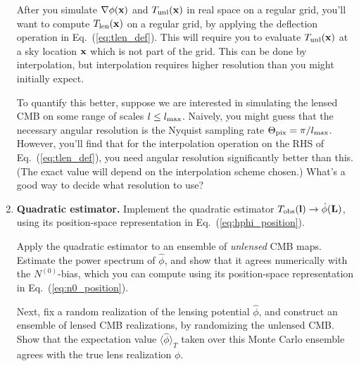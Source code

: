 \documentclass[aps,prd,superscriptaddress,groupedaddress,nofootinbib,nobibnotes]{revtex4}
\def\x{{\bf x}}
\def\l{{\bf l}}
\def\L{{\bf L}}
\def\hphi{{\hat\phi}}
\begin{document}
\begin{enumerate}
  After you simulate $\nabla\phi(\x)$ and $T_{\rm unl}(\x)$ in real space on a regular grid,
  you'll want to compute $T_{\rm len}(\x)$ on a regular grid, by applying the deflection
  operation in Eq.~(\ref{eq:tlen_def}).  This will require you to evaluate $T_{\rm unl}(\x)$
  at a sky location $\x$ which is not part of the grid.  This can be done by interpolation,
  but interpolation requires higher resolution than you might initially expect.

  To quantify this better, suppose we are interested in simulating the lensed CMB on some
  range of scales $l \le l_{\rm max}$.  Naively, you might guess that the necessary angular
  resolution is the Nyquist sampling rate $\Theta_{\rm pix} = \pi/l_{\rm max}$.  However,
  you'll find that for the interpolation operation on the RHS of Eq.~(\ref{eq:tlen_def}),
  you need angular resolution significantly better than this.  (The exact value will
  depend on the interpolation scheme chosen.)  What's a good way to decide what resolution
  to use?

\item {\bf Quadratic estimator.}
  Implement the quadratic estimator $T_{\rm obs}(\l) \rightarrow \hphi(\L)$, using its
  position-space representation in Eq.~(\ref{eq:hphi_position}).

  Apply the quadratic estimator to an ensemble of {\em unlensed} CMB maps.
  Estimate the power spectrum of $\hphi$, and show that it agrees numerically with the
  $N^{(0)}$-bias, which you can compute using its position-space representation in
  Eq.~(\ref{eq:n0_position}).

  Next, fix a random realization of the lensing potential $\hphi$, and construct an
  ensemble of lensed CMB realizations, by randomizing the unlensed CMB.  Show that
  the expectation value $\langle \hphi \rangle_T$ taken over this Monte Carlo ensemble
  agrees with the true lens realization $\phi$.

\end{enumerate}





%

% 
% 

\end{document}
